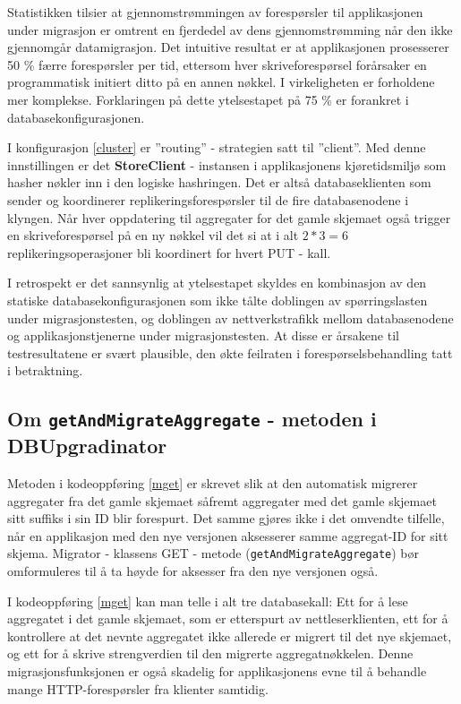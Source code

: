 Statistikken tilsier at gjennomstrømmingen av forespørsler til applikasjonen under migrasjon er omtrent en fjerdedel av dens gjennomstrømming når den ikke gjennomgår datamigrasjon. Det intuitive resultat er at applikasjonen prosesserer 50 \% færre forespørsler per tid, ettersom hver skriveforespørsel forårsaker en programmatisk initiert ditto på en annen nøkkel. I virkeligheten er forholdene mer komplekse. Forklaringen på dette ytelsestapet  på 75 \% er forankret i databasekonfigurasjonen.

I konfigurasjon \ref{cluster} er ''routing'' - strategien satt til ''client''. Med denne innstillingen er det \textbf{StoreClient} - instansen i applikasjonens kjøretidsmiljø som hasher nøkler inn i den logiske hashringen. Det er altså databaseklienten som sender og koordinerer replikeringsforespørsler til de fire databasenodene i klyngen. Når hver oppdatering til aggregater for det gamle skjemaet også trigger en skriveforespørsel på en ny nøkkel vil det si at i alt \(2 * 3 = 6\) replikeringsoperasjoner bli koordinert for hvert PUT - kall.

I retrospekt er det sannsynlig at ytelsestapet skyldes en kombinasjon av den statiske databasekonfigurasjonen som ikke tålte doblingen av spørringslasten under migrasjonstesten, og doblingen av nettverkstrafikk mellom databasenodene og applikasjonstjenerne under migrasjonstesten. At disse er årsakene til testresultatene er svært plausible, den økte feilraten i forespørselsbehandling tatt i betraktning. 

\subsection{Om \texttt{getAndMigrateAggregate} - metoden i DBUpgradinator}

Metoden i kodeoppføring \ref{mget} er skrevet slik at den automatisk migrerer aggregater fra det gamle skjemaet såfremt aggregater med det gamle skjemaet sitt suffiks i sin ID blir forespurt. Det samme gjøres ikke i det omvendte tilfelle, når en applikasjon med den nye versjonen aksesserer samme aggregat-ID for sitt skjema. Migrator - klassens GET - metode (\texttt{getAndMigrateAggregate}) bør omformuleres til å ta høyde for aksesser fra den nye versjonen også.

I kodeoppføring \ref{mget} kan man telle i alt tre databasekall: Ett for å lese aggregatet i det gamle skjemaet, som er etterspurt av nettleserklienten, ett for å kontrollere at det nevnte aggregatet ikke allerede er migrert til det nye skjemaet, og ett for å skrive strengverdien til den migrerte aggregatnøkkelen. Denne migrasjonsfunksjonen er også skadelig for applikasjonens evne til å behandle mange HTTP-forespørsler fra klienter samtidig.

%

